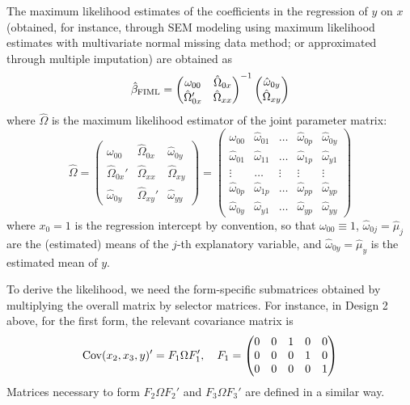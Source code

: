\documentclass[11pt]{asaproc}
\begin{document}
The maximum likelihood estimates of the coefficients in the regression of $y$ on $x$
(obtained, for instance, through SEM modeling using maximum likelihood estimates with multivariate normal missing data method;
or approximated through multiple imputation) are obtained as
\begin{equation}
    \hat\beta_{\rm FIML} =
    \begin{pmatrix}
        \omega_{00} & \hat\Omega_{0x} \\
        \hat\Omega_{0x}' & \hat\Omega_{xx}
    \end{pmatrix}^{-1}
    \begin{pmatrix}
        \hat\omega_{0y} \\
        \hat\Omega_{xy}
    \end{pmatrix}
    \label{eq:ml:regression}
\end{equation}
where $\hat\Omega$ is the maximum likelihood estimator of the joint parameter matrix:
\begin{equation}
    \hat\Omega =
    \begin{pmatrix}
        \omega_{00} & \hat\Omega_{0x} & \hat\omega_{0y} \\
        \hat\Omega_{0x}' & \hat\Omega_{xx} & \hat\Omega_{xy} \\
        \hat\omega_{0y} & \hat\Omega_{xy}' & \hat\omega_{yy}
    \end{pmatrix}
    =
    \begin{pmatrix}
            \omega_{00} & \hat\omega_{01} & \ldots & \hat\omega_{0p} & \hat\omega_{0y}  \\
        \hat\omega_{01} & \hat\omega_{11} & \ldots & \hat\omega_{1p} & \hat\omega_{y1}  \\
        \vdots & \ldots & \vdots & \vdots & \vdots  \\
        \hat\omega_{0p} & \hat\omega_{1p} & \ldots & \hat\omega_{pp} & \hat\omega_{yp}  \\
        \hat\omega_{0y} & \hat\omega_{y1} & \ldots & \hat\omega_{yp} & \hat\omega_{yy}
    \end{pmatrix}
    \label{eq:hat:Sigma}
\end{equation}
where $x_0=1$ is the regression intercept by convention, so that $\omega_{00}\equiv 1$, $\hat\omega_{0j}=\hat\mu_j$
are the (estimated) means of the $j$-th explanatory variable, and $\hat\omega_{0y}=\hat\mu_y$ is the estimated mean of $y$.

To derive the likelihood, we need the form-specific submatrices obtained by multiplying the
overall matrix by selector matrices. For instance, in Design 2 above, for the first form, the relevant covariance matrix is
\begin{equation}
    {\rm Cov}(x_2, x_3, y)' = F_1 \Omega F_1',
    \quad
    F_1 =
    \begin{pmatrix}
        0 & 0 & 1 & 0 & 0 \\
        0 & 0 & 0 & 1 & 0 \\
        0 & 0 & 0 & 0 & 1
    \end{pmatrix}
    \label{eq:selector:1}
\end{equation}
Matrices necessary to form $F_2\Omega F_2'$ and
$F_3 \Omega F_3'$ are defined in a similar way.
\end{document}
